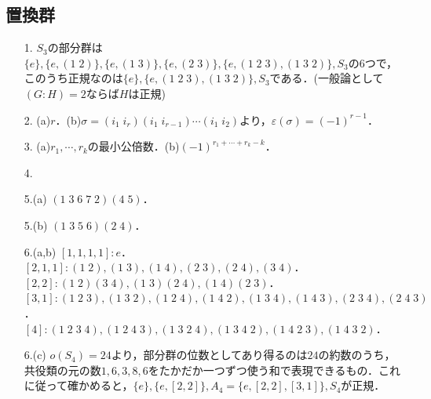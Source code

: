 \documentclass[a4paper,10pt,uplatex]{jsarticle}
\newcommand{\Set}[1]{\{#1\}}
\numberwithin{equation}{section}
\theoremstyle{mystyle}
\begin{document}
\subsection{置換群}
\begin{itemize}
    \item[1.] $S_3$の部分群は$\Set{e},\Set{e,(1\;2)},\Set{e,(1\;3)},\Set{e,(2\;3)},\Set{e,(1\;2\;3),(1\;3\;2)},S_3$の6つで，このうち正規なのは$\Set{e},\Set{e,(1\;2\;3),(1\;3\;2)},S_3$である．(一般論として$(G:H)=2$ならば$H$は正規)
    \item[2.] (a)$r$．(b)$\sigma = (i_1\;i_r)(i_1\;i_{r-1})\cdots(i_1\;i_2)$より，$\varepsilon(\sigma) = (-1)^{r-1}$．
    \item[3.] (a)$r_1,\cdots,r_k$の最小公倍数．(b)$(-1)^{r_1+\cdots+r_k-k}$．
    \item[4.] 
    \item[5.(a)] $(1\;3\;6\;7\;2)(4\;5)$．
    \item[5.(b)] $(1\;3\;5\;6)(2\;4)$．
    \item[6.(a,b)] $[1,1,1,1]:e$．
    $[2,1,1]:(1\;2),(1\;3),(1\;4),(2\;3),(2\;4),(3\;4)$．
    $[2,2]:(1\;2)(3\;4),(1\;3)(2\;4),(1\;4)(2\;3)$．
    $[3,1]:(1\;2\;3),(1\;3\;2),(1\;2\;4),(1\;4\;2),(1\;3\;4),(1\;4\;3),(2\;3\;4),(2\;4\;3)$．\\
    $[4]:(1\;2\;3\;4),(1\;2\;4\;3),(1\;3\;2\;4),(1\;3\;4\;2),(1\;4\;2\;3),(1\;4\;3\;2)$．
    \item[6.(c)] $o(S_4)=24$より，部分群の位数としてあり得るのは$24$の約数のうち，共役類の元の数$1,6,3,8,6$をたかだか一つずつ使う和で表現できるもの．これに従って確かめると，$\Set{e},\Set{e,[2,2]},A_4=\Set{e,[2,2],[3,1]},S_4$が正規．
\end{itemize}
\end{document}
